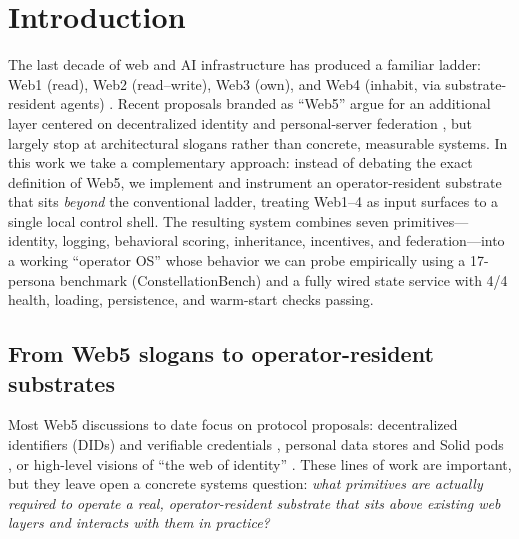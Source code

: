 
\section{Introduction}

The last decade of web and AI infrastructure has produced a familiar ladder:
Web1 (read), Web2 (read--write), Web3 (own), and Web4 (inhabit, via
substrate-resident agents) \cite{bernerslee1989,oconnor2023web4}. Recent proposals
branded as ``Web5'' argue for an additional layer centered on decentralized
identity and personal-server federation \cite{tbd_web5,solid_pods,ssi_survey}, but
largely stop at architectural slogans rather than concrete, measurable systems.
In this work we take a complementary approach: instead of debating the exact
definition of Web5, we implement and instrument an operator-resident substrate
that sits \emph{beyond} the conventional ladder, treating Web1--4 as input
surfaces to a single local control shell.
The resulting system combines seven primitives---identity, logging, behavioral
scoring, inheritance, incentives, and federation---into a working ``operator OS''
whose behavior we can probe empirically using a 17-persona benchmark
(ConstellationBench) and a fully wired state service with 4/4 health, loading,
persistence, and warm-start checks passing.

\subsection{From Web5 slogans to operator-resident substrates}

Most Web5 discussions to date focus on protocol proposals: decentralized
identifiers (DIDs) and verifiable credentials \cite{w3c_did_core}, personal data
stores and Solid pods \cite{solid_pods}, or high-level visions of ``the web of
identity'' \cite{tbd_web5}. These lines of work are important, but they leave
open a concrete systems question: \emph{what primitives are actually required
to operate a real, operator-resident substrate that sits above existing web
layers and interacts with them in practice?}

